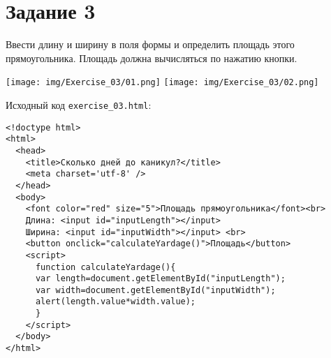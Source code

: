 \section{Задание 3}

Ввести длину и ширину в поля формы и определить площадь этого прямоугольника. Площадь должна вычисляться по нажатию кнопки.

\begin{center}
  \texttt{[image: img/Exercise\_03/01.png]}
  \texttt{[image: img/Exercise\_03/02.png]}
\end{center}

Исходный код \verb|exercise_03.html|:

\begin{verbatim}
<!doctype html>
<html>
  <head>
    <title>Сколько дней до каникул?</title>
    <meta charset='utf-8' />
  </head>
  <body>
    <font color="red" size="5">Площадь прямоугольника</font><br>
    Длина: <input id="inputLength"></input>
    Ширина: <input id="inputWidth"></input> <br>
    <button onclick="calculateYardage()">Площадь</button>
    <script>
      function calculateYardage(){
	  var length=document.getElementById("inputLength");
	  var width=document.getElementById("inputWidth");
	  alert(length.value*width.value);
      }
    </script>
  </body>
</html>
\end{verbatim}
